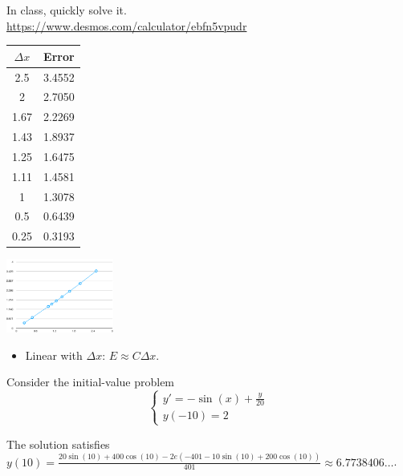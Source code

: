\begin{annotation}
	\begin{goals}
		
		In class, quickly solve it. \\

		\url{https://www.desmos.com/calculator/ebfn5vpudr}
		
		\begin{center}
		\begin{tabular}{c|c}
			$\Delta x$ & Error \\ \hline
			2.5&3.4552 \\
			2&2.7050 \\
			1.67&2.2269 \\
			1.43&1.8937 \\
			1.25&1.6475 \\
			1.11&1.4581 \\
			1&1.3078 \\
			0.5&0.6439 \\
			0.25&0.3193 \\
		\end{tabular}
		
		\includegraphics*[width=100pt]{images/module10-euler-error.pdf}
		\end{center}

		\begin{itemize}
			\item Linear with $\Delta x$: \quad $ E \approx C \Delta x$.
		\end{itemize}
	\end{goals}
\end{annotation}		

\question \label{approx:preclass}
	Consider the initial-value problem
	$$
	\begin{cases}
		y' = -\sin(x)+\frac{y}{20} \\
		y(-10)=2
	\end{cases}
	$$

	The solution satisfies $y(10)=\frac{20\sin(10)+400\cos(10)-2e(-401-10\sin(10)+200\cos(10))}{401} \approx 6.7738406\ldots$.

